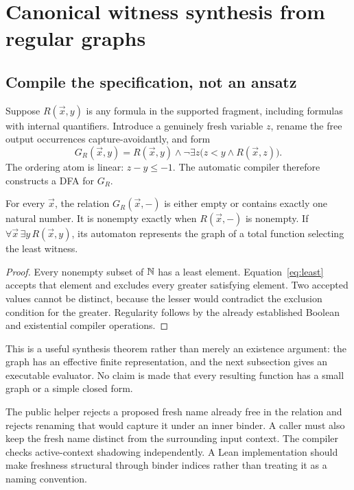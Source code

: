\section{Canonical witness synthesis from regular graphs}\label{sec:witnesses}

\subsection{Compile the specification, not an ansatz}
Suppose \(R(\vec x,y)\) is any formula in the supported fragment, including formulas with internal quantifiers. Introduce a genuinely fresh variable \(z\), rename the free output occurrences capture-avoidantly, and form
\begin{equation}\label{eq:least}
 G_R(\vec x,y)=R(\vec x,y)\land
 \neg\exists z\bigl(z<y\land R(\vec x,z)\bigr).
\end{equation}
The ordering atom is linear: \(z-y\le-1\). The automatic compiler therefore constructs a DFA for \(G_R\).

\begin{theorem}\label{thm:least}
For every \(\vec x\), the relation \(G_R(\vec x,-)\) is either empty or contains exactly one natural number. It is nonempty exactly when \(R(\vec x,-)\) is nonempty. If \(\forall\vec x\,\exists y\,R(\vec x,y)\), its automaton represents the graph of a total function selecting the least witness.
\end{theorem}
\begin{proof}
Every nonempty subset of \(\mathbb N\) has a least element. Equation~\eqref{eq:least} accepts that element and excludes every greater satisfying element. Two accepted values cannot be distinct, because the lesser would contradict the exclusion condition for the greater. Regularity follows by the already established Boolean and existential compiler operations.
\end{proof}

This is a useful synthesis theorem rather than merely an existence argument: the graph has an effective finite representation, and the next subsection gives an executable evaluator. No claim is made that every resulting function has a small graph or a simple closed form.

The public helper rejects a proposed fresh name already free in the relation and rejects renaming that would capture it under an inner binder. A caller must also keep the fresh name distinct from the surrounding input context. The compiler checks active-context shadowing independently. A Lean implementation should make freshness structural through binder indices rather than treating it as a naming convention.

